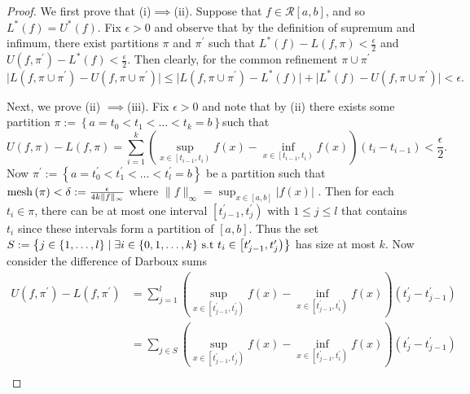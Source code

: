 \begin{proof}
We first prove that (i)$\implies$(ii). Suppose that $f\in\mathcal{R}\left[a,b\right]$,
and so $L^{*}\left(f\right)=U^{*}\left(f\right).$ Fix $\epsilon>0$
and observe that by the definition of supremum and infimum, there
exist partitions $\pi$ and $\pi^{\prime}$ such that $L^{*}\left(f\right)-L\left(f,\pi\right)<\frac{\epsilon}{2}$
and $U\left(f,\pi^{\prime}\right)-L^{*}\left(f\right)<\frac{\epsilon}{2}$.
Then clearly, for the common refinement $\pi\cup\pi^{\prime}$
\[
\lvert L\left(f,\pi\cup\pi^{\prime}\right)-U\left(f,\pi\cup\pi^{\prime}\right)\rvert\leq\lvert L\left(f,\pi\cup\pi^{\prime}\right)-L^{*}\left(f\right)\rvert+\lvert L^{*}\left(f\right)-U\left(f,\pi\cup\pi^{\prime}\right)\rvert<\epsilon.
\]

Next, we prove (ii) $\implies$(iii). Fix $\epsilon>0$ and note that
by (ii) there exists some partition $\pi:=\left\{ a=t_{0}<t_{1}<\ldots<t_{k}=b\right\} $such
that 
\begin{equation}
U\left(f,\pi\right)-L\left(f,\pi\right)=\sum_{i=1}^{k}\left(\sup_{x\in\left[t_{i-1},t_{i}\right)}f\left(x\right)-\inf_{x\in\left[t_{i-1},t_{i}\right)}f\left(x\right)\right)\left(t_{i}-t_{i-1}\right)<\frac{\epsilon}{2}.\label{eq:assumption(ii)}
\end{equation}
Now $\pi^{\prime}:=\left\{ a=t_{0}^{\prime}<t_{1}^{\prime}<\ldots<t_{l}^{\prime}=b\right\} $
be a partition such that $\mathrm{mesh}\left(\pi\right)<\delta:=\frac{\epsilon}{4k\lVert f\rVert_{\infty}}$
where $\lVert f\rVert_{\infty}=\sup_{x\in\left[a,b\right]}\lvert f\left(x\right)\rvert$
. Then for each $t_{i}\in\pi$, there can be at most one interval
$\left[t_{j-1}^{\prime},t_{j}^{\prime}\right)$ with $1\leq j\leq l$
that contains $t_{i}$ since these intervals form a partition of $\left[a,b\right].$
Thus the set $S:=\left\{ j\in\left\{ 1,\ldots,l\right\} \mid\text{\ensuremath{\exists i\in\left\{ 0,1,\ldots,k\right\} } }\text{s.t }t_{i}\in\left[t_{j-1}^{\prime},t_{j}^{\prime}\right)\right\} $
has size at most $k.$ Now consider the difference of Darboux sums
\begin{align*}
U\left(f,\pi^{\prime}\right)-L\left(f,\pi^{\prime}\right) & =\sum_{j=1}^{l}\left(\sup_{x\in\left[t_{j-1}^{\prime},t_{j}^{\prime}\right)}f\left(x\right)-\inf_{x\in\left[t_{j-1}^{\prime},t_{i}^{\prime}\right)}f\left(x\right)\right)\left(t_{j}^{\prime}-t_{j-1}^{\prime}\right)\\
 & =\sum_{j\in S}\left(\sup_{x\in\left[t_{j-1}^{\prime},t_{j}^{\prime}\right)}f\left(x\right)-\inf_{x\in\left[t_{j-1}^{\prime},t_{i}^{\prime}\right)}f\left(x\right)\right)\left(t_{j}^{\prime}-t_{j-1}^{\prime}\right)\\

\end{align*}
\end{proof}
